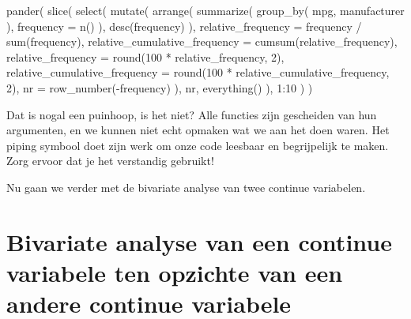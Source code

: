 \documentclass[]{tufte-book}
\newenvironment{Shaded}{}{}
\newcommand{\AttributeTok}[1]{\textcolor[rgb]{0.49,0.56,0.16}{#1}}
\newcommand{\DecValTok}[1]{\textcolor[rgb]{0.25,0.63,0.44}{#1}}
\newcommand{\FunctionTok}[1]{\textcolor[rgb]{0.02,0.16,0.49}{#1}}
\newcommand{\NormalTok}[1]{#1}
\newcommand{\SpecialCharTok}[1]{\textcolor[rgb]{0.25,0.44,0.63}{#1}}
\begin{document}
\begin{Shaded}
\begin{Highlighting}[]
\FunctionTok{pander}\NormalTok{(}
  \FunctionTok{slice}\NormalTok{(}
    \FunctionTok{select}\NormalTok{(}
      \FunctionTok{mutate}\NormalTok{(}
        \FunctionTok{arrange}\NormalTok{(}
          \FunctionTok{summarize}\NormalTok{(}
            \FunctionTok{group\_by}\NormalTok{(}
\NormalTok{              mpg,}
\NormalTok{              manufacturer}
\NormalTok{            ),}
            \AttributeTok{frequency =} \FunctionTok{n}\NormalTok{()}
\NormalTok{          ),}
          \FunctionTok{desc}\NormalTok{(frequency)}
\NormalTok{        ),}
        \AttributeTok{relative\_frequency =}\NormalTok{ frequency }\SpecialCharTok{/} \FunctionTok{sum}\NormalTok{(frequency),}
        \AttributeTok{relative\_cumulative\_frequency =} \FunctionTok{cumsum}\NormalTok{(relative\_frequency),}
        \AttributeTok{relative\_frequency =} \FunctionTok{round}\NormalTok{(}\DecValTok{100} \SpecialCharTok{*}\NormalTok{ relative\_frequency, }\DecValTok{2}\NormalTok{),}
        \AttributeTok{relative\_cumulative\_frequency =} \FunctionTok{round}\NormalTok{(}\DecValTok{100} \SpecialCharTok{*}\NormalTok{ relative\_cumulative\_frequency, }\DecValTok{2}\NormalTok{),}
        \AttributeTok{nr =} \FunctionTok{row\_number}\NormalTok{(}\SpecialCharTok{{-}}\NormalTok{frequency)}
\NormalTok{      ),}
\NormalTok{      nr,}
      \FunctionTok{everything}\NormalTok{()}
\NormalTok{    ),}
    \DecValTok{1}\SpecialCharTok{:}\DecValTok{10}
\NormalTok{  )}
\NormalTok{)}
\end{Highlighting}
\end{Shaded}

Dat is nogal een puinhoop, is het niet? Alle functies zijn gescheiden van hun argumenten, en we kunnen niet echt opmaken wat we aan het doen waren. Het piping symbool doet zijn werk om onze code leesbaar en begrijpelijk te maken. Zorg ervoor dat je het verstandig gebruikt!

Nu gaan we verder met de bivariate analyse van twee continue variabelen.

\hypertarget{bivariate-analyse-van-een-continue-variabele-ten-opzichte-van-een-andere-continue-variabele}{%
\section{Bivariate analyse van een continue variabele ten opzichte van een andere continue variabele}\label{bivariate-analyse-van-een-continue-variabele-ten-opzichte-van-een-andere-continue-variabele}}
\end{document}
